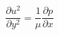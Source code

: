 \documentclass[preview,border=2pt]{standalone}
\begin{document}
\[
\frac{\partial u^{2}}{\partial y^{2}}=\frac{1}{\mu}\frac{\partial p}{\partial x}
\]
\end{document}
